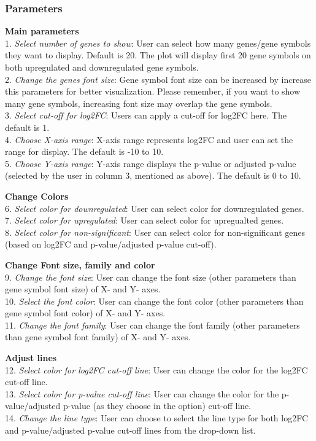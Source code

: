 \documentclass[
  a4paper,
  DIV=11,
  numbers=noendperiod,
  oneside,
  open=any]{scrreport}
\begin{document}
\subsubsection{Parameters}\label{parameters}

\textbf{Main parameters}\\
1. \emph{Select number of genes to show}: User can select how many
genes/gene symbols they want to display. Default is 20. The plot will
display first 20 gene symbols on both upregulated and downregulated gene
symbols.\\
2. \emph{Change the genes font size}: Gene symbol font size can be
increased by increase this parameters for better visualization. Please
remember, if you want to show many gene symbols, increasing font size
may overlap the gene symbols.\\
3. \emph{Select cut-off for log2FC}: Users can apply a cut-off for
log2FC here. The default is 1.\\
4. \emph{Choose X-axis range}: X-axis range represents log2FC and user
can set the range for display. The default is -10 to 10.\\
5. \emph{Choose Y-axis range}: Y-axis range displays the p-value or
adjusted p-value (selected by the user in column 3, mentioned as above).
The default is 0 to 10.

\textbf{Change Colors}\\
6. \emph{Select color for downregulated}: User can select color for
downregulated genes.\\
7. \emph{Select color for upregulated}: User can select color for
upregualted genes.\\
8. \emph{Select color for non-significant}: User can select color for
non-significant genes (based on log2FC and p-value/adjusted p-value
cut-off).

\textbf{Change Font size, family and color}\\
9. \emph{Change the font size}: User can change the font size (other
parameters than gene symbol font size) of X- and Y- axes.\\
10. \emph{Select the font color}: User can change the font color (other
parameters than gene symbol font color) of X- and Y- axes.\\
11. \emph{Change the font family}: User can change the font family
(other parameters than gene symbol font family) of X- and Y- axes.

\textbf{Adjust lines}\\
12. \emph{Select color for log2FC cut-off line}: User can change the
color for the log2FC cut-off line.\\
13. \emph{Select color for p-value cut-off line}: User can change the
color for the p-value/adjusted p-value (as they choose in the option)
cut-off line.\\
14. \emph{Change the line type}: User can choose to select the line type
for both log2FC and p-value/adjusted p-value cut-off lines from the
drop-down list.
\end{document}
